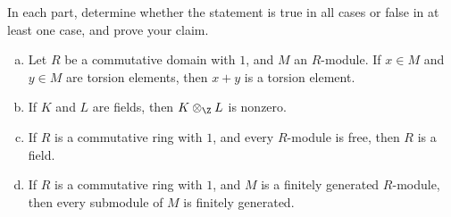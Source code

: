 \documentclass[10pt]{mypackage}
\begin{document}
\begin{problem}[Problem 6]
  In each part, determine whether the statement is true in all cases or false in at least one case, and prove your claim.
  \begin{enumerate}[(a)]
    \item Let $R$ be a commutative domain with $1$, and $M$ an $R$-module. If $x\in M$ and $y\in M$ are torsion elements, then $x + y$ is a torsion element.
    \item If $K$ and $L$ are fields, then $K\otimes_{\Z}L$ is nonzero.
    \item If $R$ is a commutative ring with $1$, and every $R$-module is free, then $R$ is a field.
    \item If $R$ is a commutative ring with $1$, and $M$ is a finitely generated $R$-module, then every submodule of $M$ is finitely generated.
  \end{enumerate}
\end{problem}
\end{document}
